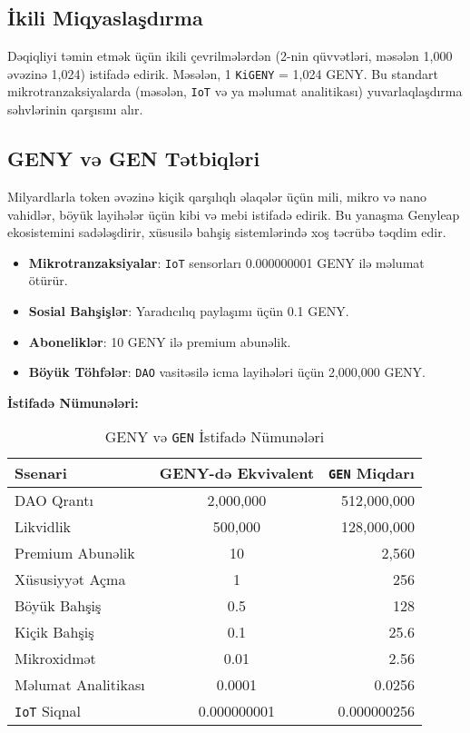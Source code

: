 \documentclass[a4paper,12pt,openany]{book}
\begin{document}
\subsection*{İkili Miqyaslaşdırma}
Dəqiqliyi təmin etmək üçün ikili çevrilmələrdən (2-nin qüvvətləri, məsələn 1,000 əvəzinə 1,024) istifadə edirik. Məsələn, 1 \texttt{KiGENY} = 1,024 GENY. Bu standart mikrotranzaksiyalarda (məsələn, \texttt{IoT} və ya məlumat analitikası) yuvarlaqlaşdırma səhvlərinin qarşısını alır.

\subsection*{GENY və GEN Tətbiqləri}
Milyardlarla token əvəzinə kiçik qarşılıqlı əlaqələr üçün mili, mikro və nano vahidlər, böyük layihələr üçün kibi və mebi istifadə edirik. Bu yanaşma Genyleap ekosistemini sadələşdirir, xüsusilə bahşiş sistemlərində xoş təcrübə təqdim edir.
\begin{itemize}
    \item \textbf{Mikrotranzaksiyalar}: \texttt{IoT} sensorları 0.000000001 GENY ilə məlumat ötürür.
    \item \textbf{Sosial Bahşişlər}: Yaradıcılıq paylaşımı üçün 0.1 GENY.
    \item \textbf{Aboneliklər}: 10 GENY ilə premium abunəlik.
    \item \textbf{Böyük Töhfələr}: \texttt{DAO} vasitəsilə icma layihələri üçün 2,000,000 GENY.
\end{itemize}

\textbf{İstifadə Nümunələri:}
\begin{table}[h]
\centering
\caption{GENY və \texttt{GEN} İstifadə Nümunələri}
\small
\begin{tabular}{l c r}
\hline
\textbf{Ssenari} & \textbf{GENY-də Ekvivalent} & \textbf{\texttt{GEN} Miqdarı} \\
\hline
DAO Qrantı & 2,000,000 & 512,000,000 \\
Likvidlik & 500,000 & 128,000,000 \\
Premium Abunəlik & 10 & 2,560 \\
Xüsusiyyət Açma & 1 & 256 \\
Böyük Bahşiş & 0.5 & 128 \\
Kiçik Bahşiş & 0.1 & 25.6 \\
Mikroxidmət & 0.01 & 2.56 \\
Məlumat Analitikası & 0.0001 & 0.0256 \\
\texttt{IoT} Siqnal & 0.000000001 & 0.000000256 \\
\hline
\end{tabular}
\end{table}
\end{document}
